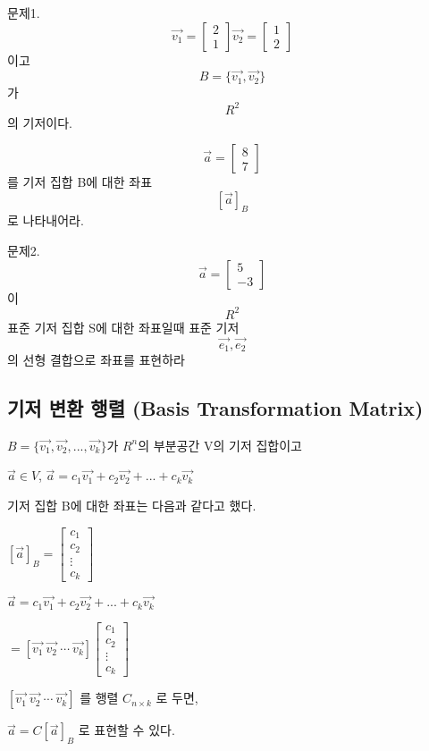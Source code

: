 \newpage
문제1. $$\vec{v_1} = \begin{bmatrix}2 \\ 1\end{bmatrix} \vec{v_2} = \begin{bmatrix}1 \\ 2\end{bmatrix}$$ 이고 $$B = \{\vec{v_1}, \vec{v_2}\}$$가 $$R^2$$의 기저이다.

$$\vec{a} = \begin{bmatrix} 8 \\ 7 \end{bmatrix}$$ 를 기저 집합 B에 대한 좌표 $$[\vec{a}]_B$$로 나타내어라. 

문제2. $$\vec{a} = \begin{bmatrix} 5 \\ -3 \end{bmatrix}$$ 이 $$R^2$$ 표준 기저 집합 S에 대한 좌표일때 표준 기저 $$\vec{e_1},\vec{e_2}$$ 의 선형 결합으로 좌표를 표현하라

\newpage
\subsection{기저 변환 행렬 (Basis Transformation Matrix)}
\begin{theorem}
$B = \{\vec{v_1}, \vec{v_2}, ..., \vec{v_k}\}$가 $R^n$의 부분공간 V의 기저 집합이고

${\vec{a}} \in V$,  $\vec{a} = c_1\vec{v_1}+ c_2\vec{v_2} +... + c_k\vec{v_k}$

기저 집합 B에 대한 좌표는 다음과 같다고 했다.

$[\vec{a}]_B = \begin{bmatrix} c_1 \\ c_2 \\ \vdots \\ c_k\end{bmatrix}$

$\vec{a} = c_1\vec{v_1}+ c_2\vec{v_2} +... + c_k\vec{v_k}$

$= [ \vec{v_1} \ \vec{v_2}  \ \cdots \ \vec{v_k} ] \begin{bmatrix} c_1 \\ c_2 \\ \vdots \\ c_k\end{bmatrix} $

$[ \vec{v_1} \ \vec{v_2}  \ \cdots \ \vec{v_k} ]$ 를 행렬 $C_{n \times k}$ 로 두면,

$\vec{a} = C[\vec{a}]_B$ 로 표현할 수 있다.
\end{theorem}

